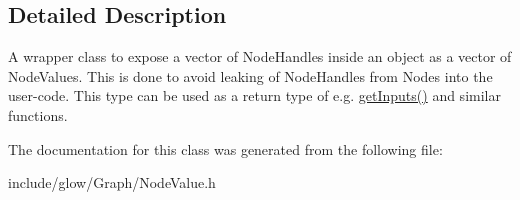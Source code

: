 \subsection{Detailed Description}
A wrapper class to expose a vector of Node\+Handles inside an object as a vector of Node\+Values. This is done to avoid leaking of Node\+Handles from Nodes into the user-\/code. This type can be used as a return type of e.\+g. \hyperlink{namespaceglow_a589ee9d58bb8726a5e764b1dd74f8070}{get\+Inputs()} and similar functions. 

The documentation for this class was generated from the following file\+:\begin{DoxyCompactItemize}
\item 
include/glow/\+Graph/Node\+Value.\+h\end{DoxyCompactItemize}
